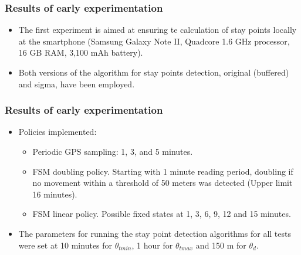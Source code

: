 \documentclass[compress,9pt,xcolor={dvipsnames,table}]{beamer}
\begin{document}
\begin{frame}[t]\frametitle{Results of early experimentation}
\begin{itemize}
  \item The first experiment is aimed at ensuring te calculation of stay points locally at the smartphone (Samsung Galaxy Note II, Quadcore 1.6 GHz processor, 16 GB RAM, 3,100 mAh battery).
  \item Both versions of the algorithm for stay points detection, original (buffered) and sigma, have been employed.  
\end{itemize}
\end{frame}


\begin{frame}[t]\frametitle{Results of early experimentation}
\begin{itemize}
  \item Policies implemented:
  \begin{itemize}
  \item Periodic GPS sampling: 1, 3, and 5 minutes.
  \item FSM doubling policy. Starting with 1 minute reading period, doubling if no movement within a threshold of 50 meters was detected (Upper limit 16 minutes).
  \item FSM linear policy. Possible fixed states at 1, 3, 6, 9, 12 and 15 minutes.
  \end{itemize}
  \item The parameters for running the stay point detection algorithms for all tests were set at 10 minutes for $\theta_{tmin}$, 1 hour for $\theta_{tmax}$ and 150 m for $\theta_{d}$.
\end{itemize}
\begin{table}[t]
\small{}
\centering
{}
\end{table}
\end{frame}
\end{document}
